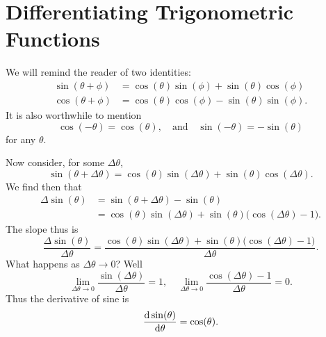 \section{Differentiating Trigonometric Functions}

We will remind the reader of two identities:
\begin{subequations}
\begin{align}
\sin(\theta+\phi) &= \cos(\theta)\sin(\phi)+\sin(\theta)\cos(\phi)\\
\cos(\theta+\phi) &= \cos(\theta)\cos(\phi)-\sin(\theta)\sin(\phi).
\end{align}
\end{subequations}
It is also worthwhile to mention
\begin{equation}
\cos(-\theta)=\cos(\theta),\quad\mbox{and}\quad
\sin(-\theta)=-\sin(\theta)
\end{equation}
for any $\theta$.

Now consider, for some $\Delta\theta$,
\begin{equation}
\sin(\theta+\Delta\theta)=
\cos(\theta)\sin(\Delta\theta)+\sin(\theta)\cos(\Delta\theta).
\end{equation}
We find then that
\begin{equation}
\begin{split}
\Delta\sin(\theta)
&=\sin(\theta+\Delta\theta)-\sin(\theta)\\
&=\cos(\theta)\sin(\Delta\theta)+\sin(\theta)\bigl(\cos(\Delta\theta)-1\bigr).
\end{split}
\end{equation}
The slope thus is
\begin{equation}
\frac{\Delta\sin(\theta)}{\Delta\theta}
=\frac{\cos(\theta)\sin(\Delta\theta)+\sin(\theta)\bigl(\cos(\Delta\theta)-1\bigr)}{\Delta\theta}.
\end{equation}
What happens as $\Delta\theta\to0$? Well
\begin{equation}
\lim_{\Delta\theta\to0}\frac{\sin(\Delta\theta)}{\Delta\theta}=1,\quad
\lim_{\Delta\theta\to0}\frac{\cos(\Delta\theta)-1}{\Delta\theta}=0.
\end{equation}
Thus the derivative of sine is
\begin{equation}
\frac{\mathrm{d}\sin(\theta)}{\mathrm{d}\theta}=\cos(\theta).
\end{equation}

